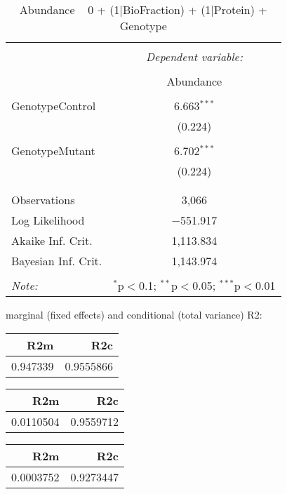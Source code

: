 \documentclass[11pt]{report}
\begin{document}
\begin{table}[!htbp] \centering 
  \caption{Abundance ~ 0 + (1|BioFraction) + (1|Protein) + Genotype} 
  \label{} 
\begin{tabular}{@{\extracolsep{5pt}}lc} 
\\[-1.8ex]\hline 
\hline \\[-1.8ex] 
 & \multicolumn{1}{c}{\textit{Dependent variable:}} \\ 
\cline{2-2} 
\\[-1.8ex] & Abundance \\ 
\hline \\[-1.8ex] 
 GenotypeControl & 6.663$^{***}$ \\ 
  & (0.224) \\ 
  & \\ 
 GenotypeMutant & 6.702$^{***}$ \\ 
  & (0.224) \\ 
  & \\ 
\hline \\[-1.8ex] 
Observations & 3,066 \\ 
Log Likelihood & $-$551.917 \\ 
Akaike Inf. Crit. & 1,113.834 \\ 
Bayesian Inf. Crit. & 1,143.974 \\ 
\hline 
\hline \\[-1.8ex] 
\textit{Note:}  & \multicolumn{1}{r}{$^{*}$p$<$0.1; $^{**}$p$<$0.05; $^{***}$p$<$0.01} \\ 
\end{tabular} 
\end{table} 
marginal (fixed effects) and conditional (total variance) R2:

\begin{tabular}{r|r}
\hline
R2m & R2c\\
\hline
0.947339 & 0.9555866\\
\hline
\end{tabular}

\begin{tabular}{r|r}
\hline
R2m & R2c\\
\hline
0.0110504 & 0.9559712\\
\hline
\end{tabular}

\begin{tabular}{r|r}
\hline
R2m & R2c\\
\hline
0.0003752 & 0.9273447\\
\hline
\end{tabular}
\end{document}
